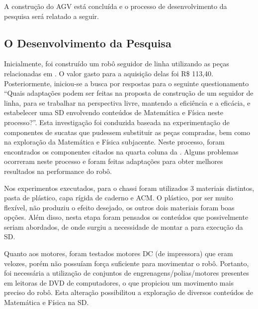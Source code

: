 \documentclass{textolivre-html}
\begin{document}
A construção do AGV está concluída e o processo de desenvolvimento da pesquisa
será relatado a seguir.


\subsection{O Desenvolvimento da Pesquisa}\label{sec-desenvolvimento}
Inicialmente, foi construído um robô seguidor de linha utilizando as peças
relacionadas em \textcite{thenorio}. O valor gasto para a aquisição delas foi R\$
113,40. Posteriormente, iniciou-se a busca por respostas para o seguinte
questionamento “Quais adaptações podem ser feitas na proposta de construção de
um seguidor de linha, para se trabalhar na perspectiva livre, mantendo a
eficiência e a eficácia, e estabelecer uma SD envolvendo conteúdos de
Matemática e Física neste processo?”. Esta investigação foi conduzida baseada
na experimentação de componentes de sucatas que pudessem substituir as peças
compradas, bem como na exploração da Matemática e Física subjacente. Neste
processo, foram encontrados os componentes citados na quarta coluna da .
Alguns problemas ocorreram neste processo e foram feitas adaptações para
obter melhores resultados na performance do robô.

Nos experimentos executados, para o chassi foram utilizados 3 materiais
distintos, pasta de plástico, capa rígida de caderno e ACM. O plástico, por ser
muito flexível, não produziu o efeito desejado, os outros dois materiais foram
boas opções. Além disso, nesta etapa foram pensados os conteúdos que
possivelmente seriam abordados, de onde surgiu a necessidade de montar a 
para execução da SD.

Quanto aos motores, foram testados motores DC (de impressora) que eram velozes,
porém não possuíam força suficiente para movimentar o robô. Portanto, foi
necessária a utilização de conjuntos de engrenagens/polias/motores presentes em
leitoras de DVD de computadores, o que propiciou um movimento mais preciso do
robô. Esta alteração possibilitou a exploração de diversos conteúdos de
Matemática e Física na SD.
\end{document}
